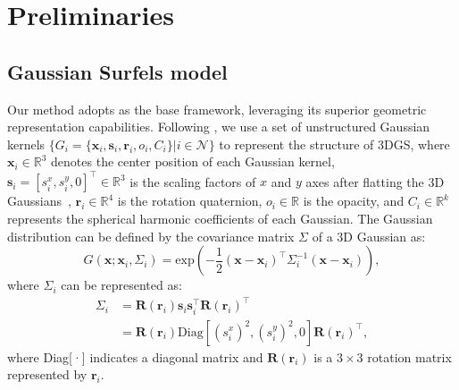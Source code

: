 \section{Preliminaries}
\label{sec:prelim}
\subsection{Gaussian Surfels model}
Our method adopts \gs as the base framework, leveraging its superior geometric representation capabilities. 
Following \gs, we use a set of unstructured Gaussian kernels $\{G_i=\{\textbf{x}_i,\textbf{s}_i,\textbf{r}_i,o_i,C_i\}|i\in
 \mathcal{N}\}$ to represent the structure of 3DGS, where  $\textbf{x}_i\in\mathbb{R}^3$ denotes the center 
 position of each Gaussian kernel, $\textbf{s}_i=[s^x_i,s^y_i,0]^\top\in\mathbb{R}^3$ is the scaling factors of $x$ and 
 $y$ axes after flatting the 3D Gaussians~\citep{kerbl20233d}, $\textbf{r}_i\in\mathbb{R}^4$ is the rotation quaternion, 
 $o_i\in\mathbb{R}$ is the opacity, and $C_i\in\mathbb{R}^k$ represents the spherical harmonic coefficients of each Gaussian. 
 The Gaussian distribution can be defined by the covariance matrix $\Sigma$ of a 3D Gaussian as:
\begin{equation}
    G(\textbf{x};\textbf{x}_i,\Sigma_i)=\text{exp}(-\frac{1}{2}(\textbf{x}-\textbf{x}_i)^\top\Sigma_i^{-1}(\textbf{x}-\textbf{x}_i)),
\end{equation}
where $\Sigma_i$ can be represented as:
\begin{equation}
\begin{aligned}
	\label{equation:sigma}
    \Sigma_i &= \textbf{R}(\textbf{r}_i)\textbf{s}_i\textbf{s}_i^\top\textbf{R}(\textbf{r}_i)^\top\\
    &= \textbf{R}(\textbf{r}_i)\text{Diag}[(s^x_i)^2,(s^y_i)^2,0]\textbf{R}(\textbf{r}_i)^\top,
\end{aligned}
\end{equation}
where Diag[·] indicates a diagonal matrix and $\textbf{R}(\textbf{r}_i)$ is a $3 \times 3$
rotation matrix represented by $\textbf{r}_i$.

